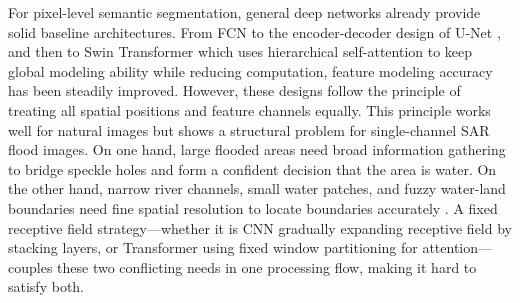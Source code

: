 \documentclass[lettersize,journal]{IEEEtran}
\begin{document}
For pixel-level semantic segmentation, general deep networks already provide solid baseline architectures. From FCN \cite{Long2015CVPR} to the encoder-decoder design of U-Net \cite{Ronneberger2015MICCAI}, and then to Swin Transformer \cite{Liu2021ICCV} which uses hierarchical self-attention to keep global modeling ability while reducing computation, feature modeling accuracy has been steadily improved. However, these designs follow the principle of treating all spatial positions and feature channels equally. This principle works well for natural images but shows a structural problem for single-channel SAR flood images. On one hand, large flooded areas need broad information gathering to bridge speckle holes and form a confident decision that the area is water. On the other hand, narrow river channels, small water patches, and fuzzy water-land boundaries need fine spatial resolution to locate boundaries accurately \cite{Tan2023RemoteSens}. A fixed receptive field strategy—whether it is CNN gradually expanding receptive field by stacking layers, or Transformer using fixed window partitioning for attention—couples these two conflicting needs in one processing flow, making it hard to satisfy both.
\end{document}

